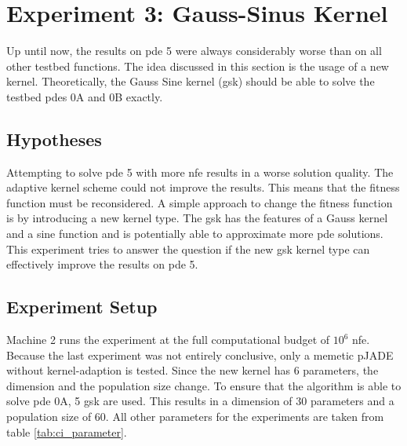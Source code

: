 \documentclass[./\jobname.tex]{subfiles}
\begin{document}
\section {Experiment 3: Gauss-Sinus Kernel}
\label{chap:experimet_3}
Up until now, the results on \gls{pde} 5 were always considerably worse than on all other testbed functions. The idea discussed in this section is the usage of a new kernel. Theoretically, the Gauss Sine kernel (\gls{gsk}) should be able to solve the testbed \gls{pde}s 0A and 0B exactly.  
\subsection{Hypotheses}
Attempting to solve \gls{pde} 5 with more \gls{nfe} results in a worse solution quality. The adaptive kernel scheme could not improve the results. This means that the fitness function must be reconsidered. A simple approach to change the fitness function is by introducing a new kernel type. The \gls{gsk} has the features of a Gauss kernel and a sine function and is potentially able to approximate more \gls{pde} solutions. This experiment tries to answer the question if the new \gls{gsk} kernel type can effectively improve the results on \gls{pde} 5. 
\subsection{Experiment Setup}

Machine 2 runs the experiment at the full computational budget of $10^6$ \gls{nfe}. Because the last experiment was not entirely conclusive, only a memetic pJADE without kernel-adaption is tested. Since the new kernel has 6 parameters, the dimension and the population size change. To ensure that the algorithm is able to solve \gls{pde} 0A, 5 \gls{gsk} are used. This results in a dimension of 30 parameters and a population size of 60. All other parameters for the experiments are taken from table \ref{tab:ci_parameter}. 
\end{document}
